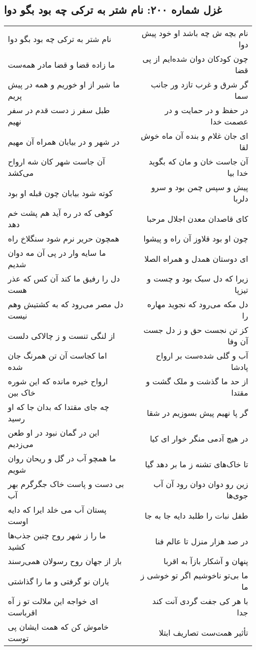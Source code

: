 \begin{center}
\section*{غزل شماره ۲۰۰: نام شتر به ترکی چه بود بگو دوا}
\label{sec:0200}
\begin{longtable}{l p{0.5cm} r}
نام شتر به ترکی چه بود بگو دوا
&&
نام بچه ش چه باشد او خود پیش دوا
\\
ما زاده قضا و قضا مادر همه‌ست
&&
چون کودکان دوان شده‌ایم از پی قضا
\\
ما شیر از او خوریم و همه در پیش پریم
&&
گر شرق و غرب تازد ور جانب سما
\\
طبل سفر ز دست قدم در سفر نهیم
&&
در حفظ و در حمایت و در عصمت خدا
\\
در شهر و در بیابان همراه آن مهیم
&&
ای جان غلام و بنده آن ماه خوش لقا
\\
آن جاست شهر کان شه ارواح می‌کشد
&&
آن جاست خان و مان که بگوید خدا بیا
\\
کوته شود بیابان چون قبله او بود
&&
پیش و سپس چمن بود و سرو دلربا
\\
کوهی که در ره آید هم پشت خم دهد
&&
کای قاصدان معدن اجلال مرحبا
\\
همچون حریر نرم شود سنگلاخ راه
&&
چون او بود قلاوز آن راه و پیشوا
\\
ما سایه وار در پی آن مه دوان شدیم
&&
ای دوستان همدل و همراه الصلا
\\
دل را رفیق ما کند آن کس که عذر هست
&&
زیرا که دل سبک بود و چست و تیزپا
\\
دل مصر می‌رود که به کشتیش وهم نیست
&&
دل مکه می‌رود که نجوید مهاره را
\\
از لنگی تنست و ز چالاکی دلست
&&
کز تن نجست حق و ز دل جست آن وفا
\\
اما کجاست آن تن همرنگ جان شده
&&
آب و گلی شده‌ست بر ارواح پادشا
\\
ارواح خیره مانده که این شوره خاک بین
&&
از حد ما گذشت و ملک گشت و مقتدا
\\
چه جای مقتدا که بدان جا که او رسید
&&
گر پا نهیم پیش بسوزیم در شقا
\\
این در گمان نبود در او طعن می‌زدیم
&&
در هیچ آدمی منگر خوار ای کیا
\\
ما همچو آب در گل و ریحان روان شویم
&&
تا خاک‌های تشنه ز ما بر دهد گیا
\\
بی دست و پاست خاک جگرگرم بهر آب
&&
زین رو دوان دوان رود آن آب جوی‌ها
\\
پستان آب می خلد ایرا که دایه اوست
&&
طفل نبات را طلبد دایه جا به جا
\\
ما را ز شهر روح چنین جذب‌ها کشید
&&
در صد هزار منزل تا عالم فنا
\\
باز از جهان روح رسولان همی‌رسند
&&
پنهان و آشکار بازآ به اقربا
\\
یاران نو گرفتی و ما را گذاشتی
&&
ما بی‌تو ناخوشیم اگر تو خوشی ز ما
\\
ای خواجه این ملالت تو ز آه اقرباست
&&
با هر کی جفت گردی آنت کند جدا
\\
خاموش کن که همت ایشان پی توست
&&
تأثیر همت‌ست تصاریف ابتلا
\\
\end{longtable}
\end{center}
